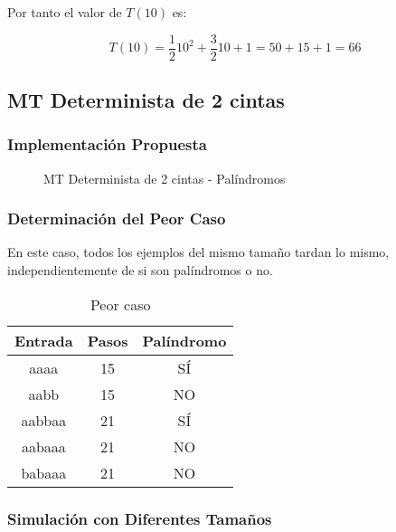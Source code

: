 \documentclass{uc3mpracticas}
\begin{document}
  Por tanto el valor de $T(10)$ es:

  $$ T(10) = \frac{1}{2}10^2 + \frac{3}{2}10 + 1 = 50 + 15 +1 = 66 $$






  \subsection{MT Determinista de 2 cintas}

  \subsubsection{Implementación Propuesta}


  \begin{figure}
    \caption{MT Determinista de 2 cintas - Palíndromos}
  \end{figure}

  \newpage

  \subsubsection{Determinación del Peor Caso}

  En este caso, todos los ejemplos del mismo tamaño tardan lo mismo, independientemente de si son palíndromos o no.


  \begin{table}[!h]
    \centering
  \begin{tabular}{|c|c|c|}
  \hline

  \textbf{Entrada} & \textbf{Pasos} & \textbf{Palíndromo} \\ \hline

  aaaa             & 15             & SÍ                  \\ \hline
  aabb             & 15             & NO                  \\ \hline
  aabbaa           & 21             & SÍ                  \\ \hline
  aabaaa           & 21             & NO                  \\ \hline
  babaaa           & 21             & NO                  \\ \hline
  \end{tabular}
  \caption{Peor caso}
  \end{table}


  \subsubsection{Simulación con Diferentes Tamaños}
\end{document}
